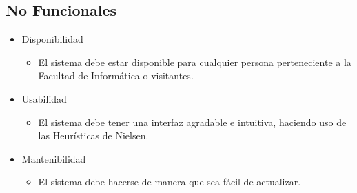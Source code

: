 \documentclass[a4paper,12pt]{article}
\begin{document}
	\subsection{No Funcionales}
	
	\begin{itemize}
		\item Disponibilidad
		\begin{itemize}
			\item El sistema debe estar disponible para cualquier persona perteneciente a la Facultad de Informática o visitantes.
		\end{itemize}
		\item Usabilidad
		\begin{itemize}
			\item El sistema debe tener una interfaz agradable e intuitiva, haciendo uso de las Heurísticas de Nielsen.
		\end{itemize}
		\item Mantenibilidad
		\begin{itemize}
			\item El sistema debe hacerse de manera que sea fácil de actualizar.
		\end{itemize}
	\end{itemize}
	
	
\end{document}
